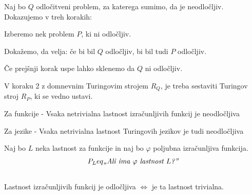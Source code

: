 \documentclass[10pt,a4paper,oneside]{book}
\begin{document}
\begin{neurejeno}
Naj bo $Q$ odločitveni problem, za katerega sumimo, da je neodločljiv.%
Dokazujemo v treh korakih:
\begin{items}
\item Izberemo nek problem $P$, ki ni odločljiv. %
\item Dokažemo, da velja: če bi bil $Q$ odločljiv, bi bil tudi $P$ odločljiv.
\item Če prejšnji korak uspe lahko sklenemo da $Q$ ni odločljiv. %
\end{items}
V koraku 2 z domnevnim Turingovim strojem $R_Q$, je treba sestaviti Turingov stroj $R_P$, ki se vedno ustavi.


\begin{items}
\item Za funkcije - Vsaka netrivialna lastnost izračunljivih funkcij je neodločljiva%
\item Za jezike - Vsaka netrivialna lastnost Turingovih jezikov je tudi neodločljiva
\end{items}
{
Naj bo $L$ neka lastnost za funkcije in naj bo $\varphi$ poljubna izračunljiva funkcija.\\
\[P_L eq \mbox{\textit{,,Ali ima $\varphi$ lastnost $L$?''}}\]\\
}
Lastnost izračunljivih funkcij je odločljiva $\Longleftrightarrow$ je ta lastnost trivialna.



\end{neurejeno}
\end{document}
